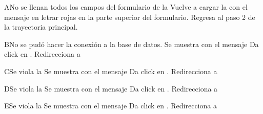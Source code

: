 		\begin{UCtrayectoriaA}{A}{No se llenan todos los campos del formulario de la   }
			\UCpaso[\UCsist] Vuelve a cargar la   con el mensaje  en letrar rojas en la parte superior del formulario.
			\UCpaso[\UCsist] Regresa al paso 2 de la trayectoria principal.
		\end{UCtrayectoriaA}


		\begin{UCtrayectoriaA}{B}{No se pudó hacer la conexión a la base de datos.  }
			\UCpaso[\UCsist] Se muestra    con el mensaje 
			\UCpaso[\UCactor] Da click en  .
			\UCpaso[\UCsist] Redirecciona a    
		\end{UCtrayectoriaA}

		\begin{UCtrayectoriaA}{C}{Se viola la   }
			\UCpaso[\UCsist] Se muestra     con el mensaje 
			\UCpaso[\UCactor] Da click en  .
			\UCpaso[\UCsist] Redirecciona a    
		\end{UCtrayectoriaA}

		\begin{UCtrayectoriaA}{D}{Se viola la   }
			\UCpaso[\UCsist] Se muestra    con el mensaje 
			\UCpaso[\UCactor] Da click en  .
			\UCpaso[\UCsist] Redirecciona a     
		\end{UCtrayectoriaA}

		\begin{UCtrayectoriaA}{E}{Se viola la   }
			\UCpaso[\UCsist] Se muestra    con el mensaje 
			\UCpaso[\UCactor] Da click en  .
			\UCpaso[\UCsist] Redirecciona a     
		\end{UCtrayectoriaA}

